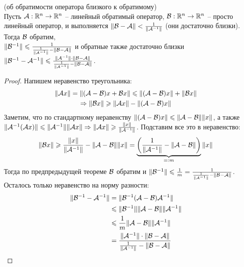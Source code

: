 \begin{theorem} (об обратимости оператора близкого к обратимому) \\
    Пусть $\mathcal{A}: \mathbb{R}^n \to \mathbb{R}^n$ -- линейный обратимый оператор, $\mathcal{B}: \mathbb{R}^n \to \mathbb{R}^n$ -- просто линейный оператор, и выполняется $\| \mathcal{B} - \mathcal{A} \| < \frac{1}{\| \mathcal{A}^{-1} \|}$ (они достаточно близки).
    Тогда $\mathcal{B}$ обратим, \\ $\| \mathcal{B}^{-1} \| \leqslant \frac{1}{\frac{1}{\| \mathcal{A}^{-1} \|} - \| \mathcal{B} - \mathcal{A} \|}$ и обратные также достаточно близки $\| \mathcal{B}^{-1} - \mathcal{A}^{-1} \| \leqslant \frac{\| \mathcal{A}^{-1} \| \cdot \| \mathcal{B} - \mathcal{A} \|}{\frac{1}{\| \mathcal{A}^{-1} \|} - \| \mathcal{B} - \mathcal{A} \|}$.
\end{theorem}
\begin{proof}
    Напишем неравенство треугольника: \begin{gather*}
        \| \mathcal{A} x \| = \| (\mathcal{A} - \mathcal{B})x + \mathcal{B} x \| \leqslant \| (\mathcal{A} - \mathcal{B})x \| + \| \mathcal{B} x \| \\
        \Rightarrow \| \mathcal{B} x \| \geqslant \| \mathcal{A} x \| - \| (\mathcal{A} - \mathcal{B})x \|
    \end{gather*}
    \quad Заметим, что по стандартному неравенству $\| (\mathcal{A} - \mathcal{B})x \| \leqslant \| \mathcal{A} - \mathcal{B} \| \| x \|$, а также $\| \mathcal{A}^{-1}(\mathcal{A} x) \| \leqslant \| \mathcal{A}^{-1} \| \| \mathcal{A} x \| \Rightarrow \| \mathcal{A} x \| \geqslant \frac{\| x \|}{\| \mathcal{A}^{-1} \| }$. 
    Подставим все это в неравенство: \begin{gather*}
        \| \mathcal{B} x \| \geqslant  \frac{\| x \|}{\| \mathcal{A}^{-1} \|} - \| \mathcal{A} - \mathcal{B} \| \| x \| = \underbrace{\left(\frac{1}{\| \mathcal{A}^{-1} \|} - \| \mathcal{A} - \mathcal{B} \| \right)}_{=: m} \| x \|
    \end{gather*}
    \quad Тогда по предпредыдущей теореме $\mathcal{B}$ обратим и $\| \mathcal{B}^{-1} \| \leqslant \frac{1}{m} = \frac{1}{\frac{1}{\| \mathcal{A}^{-1} \|} - \| \mathcal{B} - \mathcal{A} \|}$.
    Осталось только неравенство на норму разности: 
    \begin{align*} 
        \| \mathcal{B}^{-1} - \mathcal{A}^{-1} \| &= \| \mathcal{B}^{-1}(\mathcal{A} - \mathcal{B})\mathcal{A}^{-1} \| \\
        &\leqslant \| \mathcal{B}^{-1}\| \| \mathcal{A} - \mathcal{B} \| \| \mathcal{A}^{-1} \| \\
        &\leqslant \frac{1}{m}\| \mathcal{A} - \mathcal{B} \| \| \mathcal{A}^{-1} \| \\
        &= \frac{\| \mathcal{A}^{-1} \| \cdot \| \mathcal{B} - \mathcal{A} \|}{\frac{1}{\| \mathcal{A}^{-1} \|} - \| \mathcal{B} - \mathcal{A} \|}
    \end{align*}
\end{proof}